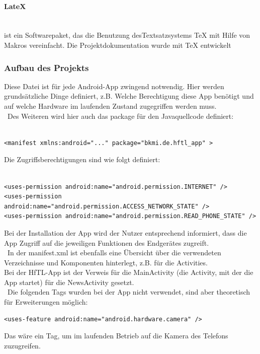 \paragraph{LateX}
\ \\[1em]
ist ein Softwarepaket, das die Benutzung desTextsatzsystems TeX mit Hilfe von Makros vereinfacht. 
Die Projektdokumentation wurde mit TeX entwickelt 

\newpage

\subsubsection{Aufbau des Projekts}
Diese Datei ist für jede Android-App zwingend notwendig. Hier werden grundsätzliche Dinge definiert, z.B. Welche Berechtigung diese App benötigt und auf welche Hardware im laufenden Zustand zugegriffen werden muss.
\\\
Des Weiteren wird hier auch das package für den Javaquellcode definiert:\\\
\lstset{language=XML}
\begin{lstlisting}[caption={AndroidManifest.XML},label=package, frame=single]
<manifest xmlns:android="..." package="bkmi.de.hftl_app" >
\end{lstlisting}
Die Zugriffsberechtigungen sind wie folgt definiert:\\\

\begin{lstlisting}[caption={AndroidManifest.XML},label=permissions, frame=single]
<uses-permission android:name="android.permission.INTERNET" />
<uses-permission android:name="android.permission.ACCESS_NETWORK_STATE" />
<uses-permission android:name="android.permission.READ_PHONE_STATE" />
\end{lstlisting}
Bei der Installation der App wird der Nutzer entsprechend informiert, dass die App Zugriff auf die jeweiligen Funktionen des Endgerätes zugreift.
 \\\
In der manifest.xml ist ebenfalls eine Übersicht über die verwendeten Verzeichnisse und Komponenten hinterlegt, z.B. für die Activities.\\
Bei der HfTL-App ist der Verweis für die MainActivity (die Activity, mit der die App startet) für die NewsActivity gesetzt.
 \\\ 
Die folgenden Tags wurden bei der App nicht verwendet, sind aber theoretisch für Erweiterungen möglich:
\begin{lstlisting}[caption={Zugriffsbeispiel},label=perm-examble, frame=single]
<uses-feature android:name="android.hardware.camera" />
\end{lstlisting}
Das wäre ein Tag, um im laufenden Betrieb auf die Kamera des Telefons zuzugreifen.

